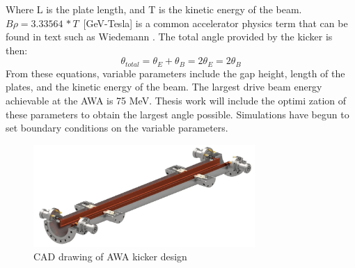 Where L is the plate length, and T is the kinetic energy of the beam. $B\rho=3.33564\,*T\,$ [GeV-Tesla] is a 
common accelerator physics term that can be found in text such as Wiedemann \cite{Wiedemann}. 
The total angle provided by the kicker is then: 
\begin{equation}
\theta_{total}= \theta_E+\theta_B=2\theta_E=2\theta_B
\end{equation}
From these equations, variable parameters include the gap height, length of the plates, and 
the kinetic energy of the beam. The largest drive beam energy achievable at the AWA is 75 MeV. 
Thesis work will include the optimi
zation of these parameters to obtain the largest angle possible.
Simulations have begun to set boundary conditions on the variable parameters. 
\begin{figure}[h]
	\begin{center}
		\includegraphics[width=0.75\textwidth]{./images/kicker}\caption{CAD drawing of AWA kicker design \cite{AWAkicker}}
		\label{fig:AWAkicker}
	\end{center}
\end{figure}




